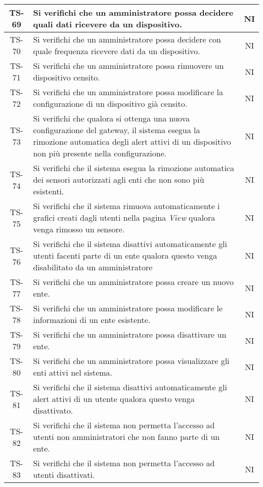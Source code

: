 \begin{center}
\begin{longtable}{|c|p{10cm}|c|}
			 \hline
			 TS-69 & Si verifichi che un amministratore possa decidere quali dati ricevere da un dispositivo. & NI \\
			 \hline
			 TS-70 & Si verifichi che un amministratore possa decidere con quale frequenza ricevere dati da un dispositivo. & NI \\
			 \hline
			 TS-71 & Si verifichi che un amministratore possa rimuovere un dispositivo censito. & NI \\
			 \hline
			 TS-72 & Si verifichi che un amministratore possa modificare la configurazione di un dispositivo già censito. & NI \\
			 \hline
			 TS-73 & Si verifichi che qualora si ottenga una nuova configurazione del gateway, il sistema esegua la rimozione automatica degli alert attivi di un dispositivo non più presente nella configurazione. & NI \\
			 \hline
			 TS-74 & Si verifichi che il sistema esegua la rimozione automatica dei sensori autorizzati agli enti che non sono più esistenti. & NI \\
			 \hline
			 TS-75 & Si verifichi che il sistema rimuova automaticamente i grafici creati dagli utenti nella pagina \textit{View} qualora venga rimosso un sensore. & NI \\
			 \hline
			 TS-76 & Si verifichi che il sistema disattivi automaticamente gli utenti facenti parte di un ente qualora questo venga disabilitato da un amministratore & NI \\
			 \hline
			 TS-77 & Si verifichi che un amministratore possa creare un nuovo ente. & NI \\
			 \hline
			 TS-78 & Si verifichi che un amministratore possa modificare le informazioni di un ente esistente. & NI \\
			 \hline
			 TS-79 & Si verifichi che un amministratore possa disattivare un ente. & NI \\
			 \hline
			 TS-80 & Si verifichi che un amministratore possa visualizzare gli enti attivi nel sistema. & NI \\
			 \hline
			 TS-81 & Si verifichi che il sistema disattivi automaticamente gli alert attivi di un utente qualora questo venga disattivato. & NI \\
			 \hline
			 TS-82 & Si verifichi che il sistema non permetta l'accesso ad utenti non amministratori che non fanno parte di un ente. & NI \\
			 \hline
			 TS-83 & Si verifichi che il sistema non permetta l'accesso ad utenti disattivati. & NI \\

\end{longtable}
\end{center}

